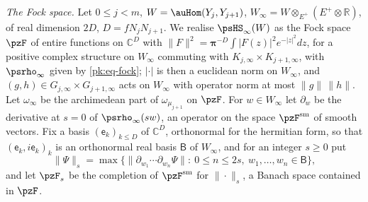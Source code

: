 \documentclass[10pt]{amsart}
\theoremstyle{definition}
\theoremstyle{remark}
\newcommand{\C}{\mathbb C}
\newcommand{\R}{\mathbb R}
\begin{document}
\emph{The Fock space.} Let $0\le j<m$, $W=\auHom(Y_j,Y_{j+1})$, $W_\infty=W\otimes_{E^+}(E^+\otimes\R)$,
of real dimension $2D$, $D=fN_jN_{j+1}$. We realise $\psHS_\infty(W)$ as the Fock space $\pzF$ of
entire functions on $\C^D$ with $\|F\|^2=\boldsymbol\pi^{-D}\int|F(z)|^2e^{-|z|^2}dz$, for a
positive complex structure on $W_\infty$ commuting with $K_{j,\infty}\times K_{j+1,\infty}$, with
$\psrho_\infty$ given by \eqref{pk:eq-fock}; $|\cdot|$ is then a euclidean norm on $W_\infty$, and
$(g,h)\in G_{j,\infty}\times G_{j+1,\infty}$ acts on $W_\infty$ with operator norm at most
$\|g\|\,\|h\|$. Let $\omega_\infty$ be the archimedean part of $\omega_{\mu_{j+1}}$ on $\pzF$. For
$w\in W_\infty$ let $\partial_w$ be the derivative at $s=0$ of $\psrho_\infty(sw)$, an operator on the
space $\pzF^{\mathrm{sm}}$ of smooth vectors. Fix a basis $(\mathsf e_k)_{k\le D}$ of $\C^D$,
orthonormal for the hermitian form, so that $(\mathsf e_k,i\mathsf e_k)_k$ is an orthonormal real
basis $\mathsf B$ of $W_\infty$, and for an integer $s\ge0$ put
\[
\|\Psi\|_s=\max\bigl\{\|\partial_{w_1}\cdots\partial_{w_n}\Psi\|:\ 0\le n\le2s,\ w_1,\dots,w_n\in
\mathsf B\bigr\},
\]
and let $\pzF_s$ be the completion of $\pzF^{\mathrm{sm}}$ for $\|\cdot\|_s$, a Banach space
contained in $\pzF$.
\end{document}
